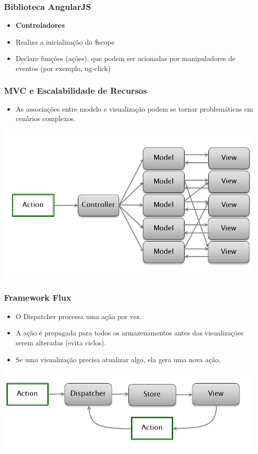 \documentclass{beamer}
\begin{document}
\begin{frame}
      \frametitle{Biblioteca AngularJS}

      \begin{itemize}
            \item \textbf{Controladores}
            \item Realiza a inicialização do \$scope
            \item Declare funções (ações), que podem ser acionadas por manipuladores de eventos (por exemplo, ng-click)
      \end{itemize}

\end{frame}
\begin{frame}
      \frametitle{MVC e Escalabilidade de Recursos}

      \begin{itemize}
            \item As associações entre modelo e visualização podem se tornar problemáticas em cenários complexos.
      \end{itemize}
      \begin{center}
            \includegraphics[width=0.6\linewidth]{assets/aula-tads-pdwa5/mvc-scalability.png}
      \end{center}
\end{frame}

\begin{frame}
      \frametitle{Framework Flux}

      \begin{itemize}
            \item O Dispatcher processa uma ação por vez.
            \item A ação é propagada para todos os armazenamentos antes das visualizações serem alteradas (evita ciclos).
            \item Se uma visualização precisa atualizar algo, ela gera uma nova ação.
      \end{itemize}
      \begin{center}
            \includegraphics[width=0.8\linewidth]{assets/aula-tads-pdwa5/flux.png}
      \end{center}
\end{frame}
\end{document}
